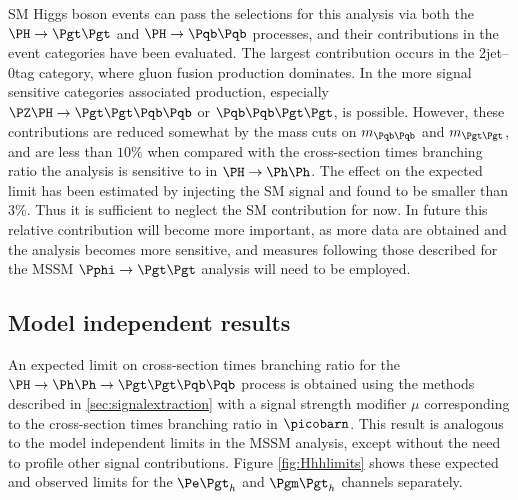 \ac{SM} Higgs boson events can pass the selections for this analysis via both the $\PH\to\Pgt\Pgt$
and $\PH\to\Pqb\Pqb$ processes, and their contributions in the event
categories have been evaluated. The largest contribution occurs in the
2jet--0tag category, where gluon fusion production dominates. In the more signal
sensitive categories associated production, especially
$\PZ\PH\to\Pgt\Pgt\Pqb\Pqb$ or $\Pqb\Pqb\Pgt\Pgt$, is possible. 
However, these contributions are
reduced somewhat by the mass cuts on $m_{\Pqb\Pqb}$ and $m_{\Pgt\Pgt}$, and 
are less than $10\%$ when compared with the cross-section times branching ratio
the analysis is sensitive to in $\PH\to\Ph\Ph$. The effect on the expected limit
has been estimated by injecting the \ac{SM} signal and found to be smaller than
$3\%$. Thus it is sufficient to neglect the \ac{SM} contribution for now. In
future this relative contribution will become more important, as more data are
obtained and the analysis becomes more sensitive, and measures following those
described for the \ac{MSSM} $\Pphi\to\Pgt\Pgt$ analysis will need to be
employed. 

\subsection{Model independent results}

An expected limit on cross-section times branching ratio for the $\Hhh$
process is obtained using the methods described in \ref{sec:signalextraction}
with a signal strength modifier $\mu$ corresponding to the cross-section times
branching ratio in $\picobarn$. This result is analogous to the model independent
limits in the \ac{MSSM} analysis, except without the need to profile other
signal contributions. Figure \ref{fig:Hhhlimits} shows these
expected and observed limits for the $\etau$ and $\mutau$ channels separately.


